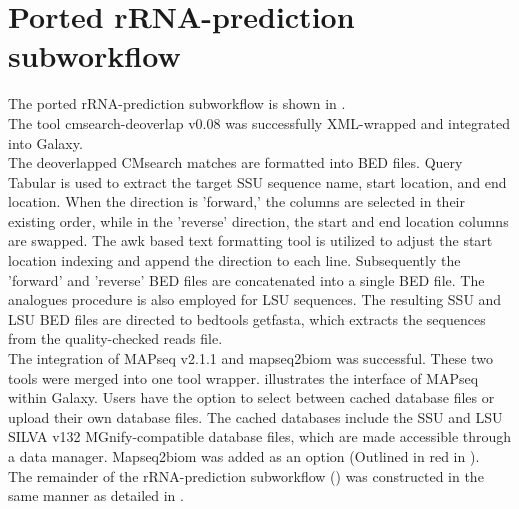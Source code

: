 \section{Ported rRNA-prediction subworkflow}\label{results_subworkflow integration}
The ported rRNA-prediction subworkflow is shown in .\\
The tool cmsearch-deoverlap v0.08 was successfully XML-wrapped and integrated into Galaxy.\\
The deoverlapped CMsearch matches are formatted into BED files. Query Tabular is used to extract the target SSU sequence name, start location, and end location. When the direction is 'forward,' the columns are selected in their existing order, while in the 'reverse' direction, the start and end location columns are swapped. The awk based text formatting tool is utilized to adjust the start location indexing and append the direction to each line. Subsequently the 'forward' and 'reverse' BED files are concatenated into a single BED file. The analogues procedure is also employed for LSU sequences. The resulting SSU and LSU BED files are directed to bedtools getfasta, which extracts the sequences from the quality-checked reads file.\\
The integration of MAPseq v2.1.1 and mapseq2biom was successful. These two tools were merged into one tool wrapper.  illustrates the interface of MAPseq within Galaxy. Users have the option to select between cached database files or upload their own database files. The cached databases include the SSU and LSU SILVA v132 MGnify-compatible database files, which are made accessible through a data manager. Mapseq2biom was added as an option (Outlined in red in ).\\
The remainder of the rRNA-prediction subworkflow () was constructed in the same manner as detailed in .


